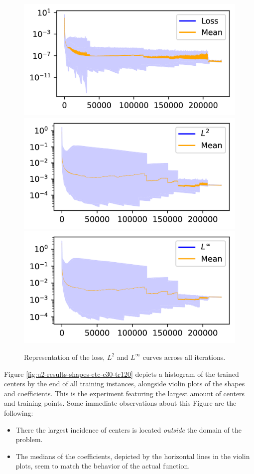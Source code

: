 \documentclass[12pt]{report} %
\begin{document}
\begin{figure}[h]
  \includegraphics[width=.7\textwidth]{imagenes/experiments/1d/statistical_1d_full_scheduler_interpolation/Loss_curves_semilogy_all.png}
  \includegraphics[width=.7\textwidth]{imagenes/experiments/1d/statistical_1d_full_scheduler_interpolation/L2_curves_semilogy_all.png}
  \includegraphics[width=.7\textwidth]{imagenes/experiments/1d/statistical_1d_full_scheduler_interpolation/Linf_curves_semilogy_all.png}
  \caption{Representation of the loss, $L^2$ and $L^\infty$ curves across all iterations.}
  \label{fig:u2-results-all}
\end{figure}


Figure \ref{fig:u2-results-shapes-etc-c30-tr120} depicts a histogram of the trained centers by the end of all training instances, alongside violin plots of the shapes and coefficients. This is the experiment featuring the largest amount of centers and training points. Some immediate observations about this Figure are the following: \begin{itemize}
  \item There the largest incidence of centers is located \textit{outside} the domain of the problem.
  \item The medians of the coefficients, depicted by the horizontal lines in the violin plots, seem to match the behavior of the actual function.
\end{itemize}
\end{document}
